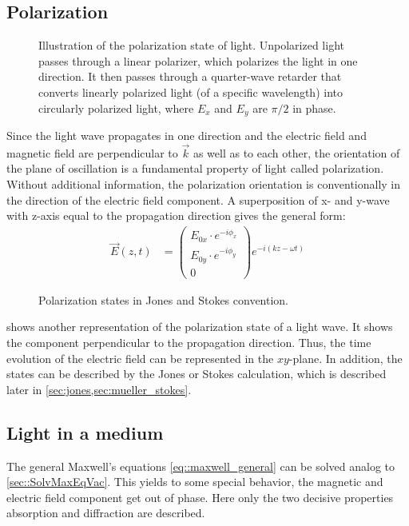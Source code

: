 \subsection{Polarization}\label{sec:polarization}
%
\begin{figure}[!t]
\centering
\setlength{\tikzwidth}{\textwidth}
\caption{Illustration of the polarization state of light. Unpolarized light passes through a linear polarizer, which polarizes the light in one direction. It then passes through a quarter-wave retarder that converts linearly polarized light (of a specific wavelength) into circularly polarized light, where $E_x$ and $E_y$ are $\pi/2$ in phase.}
\label{fig:polarization_state}
\end{figure}
%
Since the light wave propagates in one direction and the electric field and magnetic field are perpendicular to $\vec{k}$ as well as to each other, the orientation of the plane of oscillation is a fundamental property of light called polarization.
Without additional information, the polarization orientation is conventionally in the direction of the electric field component.
A superposition of x- and y-wave with z-axis equal to the propagation direction gives the general form:
\begin{align}
\vec{E}(z,t) &= \begin{pmatrix} E_{0x} \cdot e^{ -i \phi_x } \\ E_{0y} \cdot e^{ -i \phi_y } \\ 0 \end{pmatrix}
e^{ -i (kz - \omega t)}
\end{align}
%
\begin{figure}[!t]
\centering
\tikzset{external/export=false}

\caption{Polarization states in Jones and Stokes convention.}
\label{fig:polarization_state_vectors}
\end{figure}
%
 shows another representation of the polarization state of a light wave.
It shows the component perpendicular to the propagation direction.
Thus, the time evolution of the electric field can be represented in the $xy$-plane.
In addition, the states can be described by the Jones or Stokes calculation, which is described later in \cref{sec:jones,sec:mueller_stokes}.
%
%
%
\subsection{Light in a medium}
%
The general Maxwell's equations \cref{eq::maxwell_general} can be solved analog to \cref{sec::SolvMaxEqVac}. This yields to some special behavior, \eg{} the magnetic and electric field component get out of phase.
Here only the two decisive properties absorption and diffraction are described.
% 
% 
%

